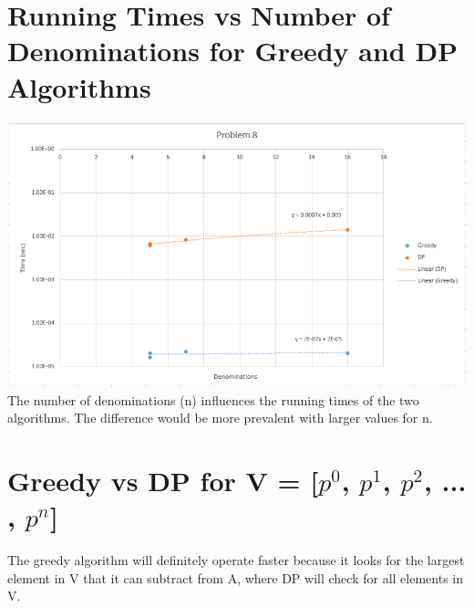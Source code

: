 \documentclass[11pt,letterpaper]{article}
\begin{document}
\section{Running Times vs Number of Denominations for Greedy and DP Algorithms}
	\hskip-1.0cm\includegraphics[width=6.5in]{p8.png}\\
	The number of denominations (n) influences the running times of the two algorithms. The difference would be more prevalent with larger values for n.

\section{Greedy vs DP for  V = [$p^0$, $p^1$, $p^2$, ... , $p^n$]}
	The greedy algorithm will definitely operate faster because it looks for the largest element in V that it can subtract from A, where DP will check for all elements in V.
\end{document}
